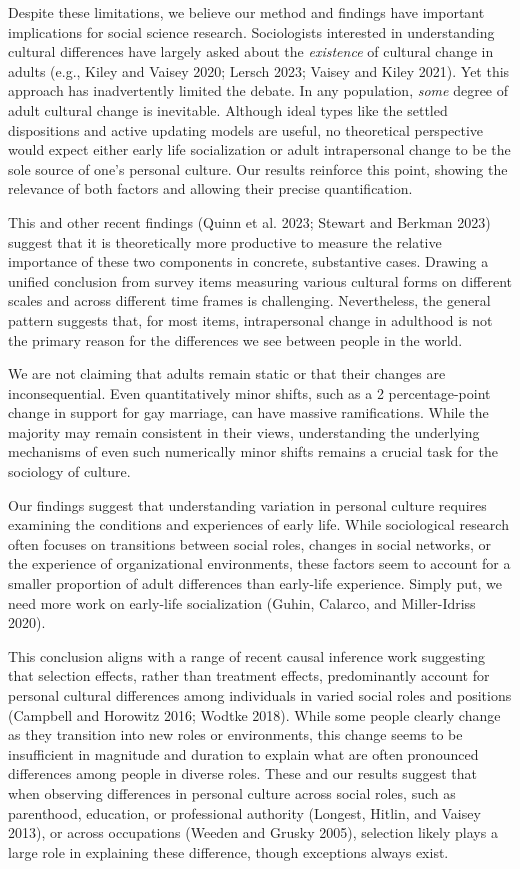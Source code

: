 \documentclass[
  12pt,
]{article}
\begin{document}
Despite these limitations, we believe our method and findings have
important implications for social science research. Sociologists
interested in understanding cultural differences have largely asked
about the \emph{existence} of cultural change in adults (e.g., Kiley and
Vaisey 2020; Lersch 2023; Vaisey and Kiley 2021). Yet this approach has
inadvertently limited the debate. In any population, \emph{some} degree
of adult cultural change is inevitable. Although ideal types like the
settled dispositions and active updating models are useful, no
theoretical perspective would expect either early life socialization or
adult intrapersonal change to be the sole source of one's personal
culture. Our results reinforce this point, showing the relevance of both
factors and allowing their precise quantification.

This and other recent findings (Quinn et al. 2023; Stewart and Berkman
2023) suggest that it is theoretically more productive to measure the
relative importance of these two components in concrete, substantive
cases. Drawing a unified conclusion from survey items measuring various
cultural forms on different scales and across different time frames is
challenging. Nevertheless, the general pattern suggests that, for most
items, intrapersonal change in adulthood is not the primary reason for
the differences we see between people in the world.

We are not claiming that adults remain static or that their changes are
inconsequential. Even quantitatively minor shifts, such as a 2
percentage-point change in support for gay marriage, can have massive
ramifications. While the majority may remain consistent in their views,
understanding the underlying mechanisms of even such numerically minor
shifts remains a crucial task for the sociology of culture.

Our findings suggest that understanding variation in personal culture
requires examining the conditions and experiences of early life. While
sociological research often focuses on transitions between social roles,
changes in social networks, or the experience of organizational
environments, these factors seem to account for a smaller proportion of
adult differences than early-life experience. Simply put, we need more
work on early-life socialization (Guhin, Calarco, and Miller-Idriss
2020).

This conclusion aligns with a range of recent causal inference work
suggesting that selection effects, rather than treatment effects,
predominantly account for personal cultural differences among
individuals in varied social roles and positions (Campbell and Horowitz
2016; Wodtke 2018). While some people clearly change as they transition
into new roles or environments, this change seems to be insufficient in
magnitude and duration to explain what are often pronounced differences
among people in diverse roles. These and our results suggest that when
observing differences in personal culture across social roles, such as
parenthood, education, or professional authority (Longest, Hitlin, and
Vaisey 2013), or across occupations (Weeden and Grusky 2005), selection
likely plays a large role in explaining these difference, though
exceptions always exist.
\end{document}
